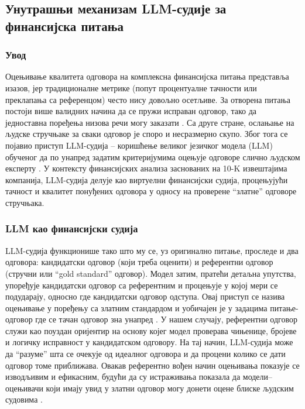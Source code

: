 \subsection{Унутрашњи механизам LLM-судије за финансијска питања}

\subsubsection{Увод}

Оцењивање квалитета одговора на комплексна финансијска питања представља изазов, јер традиционалне метрике (попут процентуалне тачности или преклапања са референцом) често нису довољно осетљиве. За отворена питања постоји више валидних начина да се пружи исправан одговор, тако да једноставна поређења низова речи могу заказати \cite{evidently_ai_llm_judge_2025}. Са друге стране, ослањање на људске стручњаке за сваки одговор је споро и несразмерно скупо. Због тога се појавио приступ LLM-судија -- коришћење великог језичког модела (LLM) обученог да по унапред задатим критеријумима оцењује одговоре слично људском експерту \cite{zheng_judging_llm_2023,evidently_ai_llm_judge_2025}. У контексту финансијских анализа заснованих на 10-K извештајима компанија, LLM-судија делује као виртуелни финансијски судија, процењујући тачност и квалитет понуђених одговора у односу на проверене ``златне'' одговоре стручњака.

\subsubsection{LLM као финансијски судија}

LLM-судија функционише тако што му се, уз оригинално питање, проследе и два одговора: кандидатски одговор (који треба оценити) и референтни одговор (стручни или ``gold standard'' одговор). Модел затим, пратећи детаљна упутства, упоређује кандидатски одговор са референтним и процењује у којој мери се подударају, односно где кандидатски одговор одступа. Овај приступ се назива оцењивање у поређењу са златним стандардом и уобичајен је у задацима питање-одговор где се тачан одговор зна унапред \cite{evidently_ai_llm_judge_2025}. У нашем случају, референтни одговор служи као поуздан оријентир на основу којег модел проверава чињенице, бројеве и логичку исправност у кандидатском одговору. На тај начин, LLM-судија може да ``разуме'' шта се очекује од идеалног одговора и да процени колико се дати одговор томе приближава. Овакав референтно вођен начин оцењивања показује се изводљивим и ефикасним, будући да су истраживања показала да модели--оцењивачи који имају увид у златни одговор могу донети оцене блиске људским судовима \cite{zheng_judging_llm_2023}.

